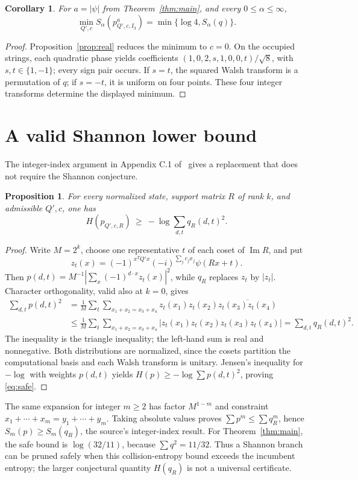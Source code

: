 \documentclass[11pt]{article}
\newtheorem{corollary}[theorem]{Corollary}
\newtheorem{proposition}[theorem]{Proposition}
\newcommand{\HH}{H}
\begin{document}
\begin{corollary}\label{cor:minimum}
For $a=|\psi|$ from Theorem~\ref{thm:main}, and every
$0\le\alpha\le\infty$,
\[
 \min_{Q',c} S_\alpha(p^a_{Q',c,I_3})
 =\min\{\log4,S_\alpha(q)\}.
\]
\end{corollary}
\begin{proof}
Proposition~\ref{prop:real} reduces the minimum to $c=0$.
On the occupied strings, each quadratic phase yields coefficients
$(1,0,2,s,1,0,0,t)/\sqrt8$, with $s,t\in\{1,-1\}$;
every sign pair occurs. If $s=t$, the squared Walsh transform is a
permutation of $q$; if $s=-t$, it is uniform on four points.
These four integer transforms determine the displayed minimum.
\end{proof}

\section{A valid Shannon lower bound}
The integer-index argument in Appendix C.1 of~\cite{posing} gives a
replacement that does not require the Shannon conjecture.
\begin{proposition}\label{prop:safe}
For every normalized state, support matrix $R$ of rank $k$, and
admissible $Q',c$, one has
\begin{equation}\label{eq:safe}
 \HH(p_{Q',c,R})\ \ge\ -\log\sum_{d,t}q_R(d,t)^2.
\end{equation}
\end{proposition}
\begin{proof}
Write $M=2^k$, choose one representative $t$ of each coset of
$\operatorname{Im}R$, and put
\[
z_t(x)=(-1)^{x^TQ'x}(-i)^{\sum_jc_jx_j}\psi(Rx+t).
\]
Then $p(d,t)=M^{-1}|\sum_x(-1)^{d\cdot x}z_t(x)|^2$,
while $q_R$ replaces $z_t$ by $|z_t|$.
Character orthogonality, valid also at $k=0$, gives
\begin{align*}
 \sum_{d,t}p(d,t)^2
 &=\frac1M\sum_t\sum_{x_1+x_2=x_3+x_4}
 z_t(x_1)z_t(x_2)\overline{z_t(x_3)z_t(x_4)}\\
 &\le\frac1M\sum_t\sum_{x_1+x_2=x_3+x_4}
 |z_t(x_1)z_t(x_2)z_t(x_3)z_t(x_4)|
 =\sum_{d,t}q_R(d,t)^2.
\end{align*}
The inequality is the triangle inequality; the left-hand sum is real
and nonnegative. Both distributions are normalized, since the cosets
partition the computational basis and each Walsh transform is unitary.
Jensen's inequality for $-\log$ with weights $p(d,t)$ yields
$\HH(p)\ge-\log\sum p(d,t)^2$, proving \eqref{eq:safe}.
\end{proof}
The same expansion for integer $m\ge2$ has factor $M^{1-m}$ and
constraint $x_1+\cdots+x_m=y_1+\cdots+y_m$.
Taking absolute values proves $\sum p^m\le\sum q_R^m$, hence
$S_m(p)\ge S_m(q_R)$, the source's integer-index result.
For Theorem~\ref{thm:main}, the safe bound is $\log(32/11)$,
because $\sum q^2=11/32$. Thus a Shannon branch can be pruned safely
when this collision-entropy bound exceeds the incumbent entropy;
the larger conjectural quantity $\HH(q_R)$ is not a universal certificate.
\end{document}
